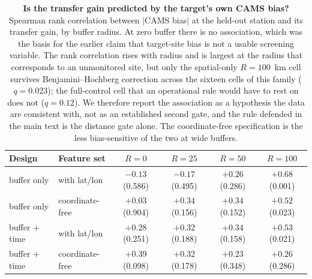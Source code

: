 \documentclass[11pt]{article}
\begin{document}
\begin{table}[htbp]\centering\footnotesize
\caption{\textbf{Is the transfer gain predicted by the target's own CAMS bias?} Spearman rank correlation between $|$CAMS bias$|$ at the held-out station and its transfer gain, by buffer radius. At zero buffer there is no association, which was the basis for the earlier claim that target-site bias is not a usable screening variable. The rank correlation rises with radius and is largest at the radius that corresponds to an unmonitored site, but only the spatial-only $R=100$~km cell survives Benjamini--Hochberg correction across the sixteen cells of this family ($q=0.023$); the full-control cell that an operational rule would have to rest on does not ($q=0.12$). We therefore report the association as a hypothesis the data are consistent with, not as an established second gate, and the rule defended in the main text is the distance gate alone. The coordinate-free specification is the less bias-sensitive of the two at wide buffers.}
\label{si:t23}
\begin{tabular}{llcccc}\toprule
Design & Feature set & $R=0$ & $R=25$ & $R=50$ & $R=100$ \\ \midrule
buffer only & with lat/lon & $-0.13$ (0.586) & $-0.17$ (0.495) & $+0.26$ (0.286) & $+0.68$ (0.001) \\
buffer only & coordinate-free & $+0.03$ (0.904) & $+0.34$ (0.156) & $+0.34$ (0.152) & $+0.52$ (0.023) \\
buffer $+$ time & with lat/lon & $+0.28$ (0.251) & $+0.32$ (0.188) & $+0.34$ (0.158) & $+0.53$ (0.021) \\
buffer $+$ time & coordinate-free & $+0.39$ (0.098) & $+0.32$ (0.178) & $+0.23$ (0.348) & $+0.26$ (0.286) \\
\bottomrule\end{tabular}\end{table}
\end{document}

